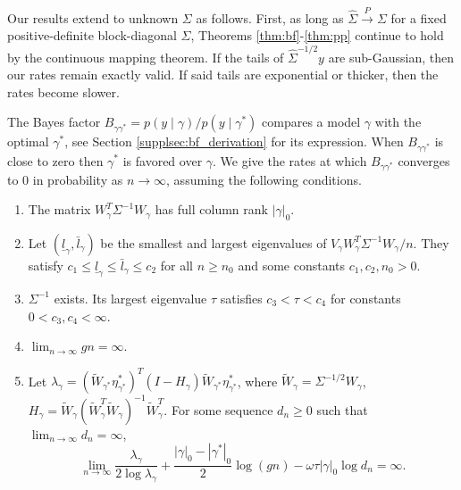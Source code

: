 Our results extend to unknown $\Sigma$ as follows. First, as long as $\hat{\Sigma} \stackrel{P}{\longrightarrow} \Sigma$ for a fixed positive-definite block-diagonal $\Sigma$, Theorems \ref{thm:bf}-\ref{thm:pp} continue to hold by the continuous mapping theorem.
If the tails of $\hat{\Sigma}^{-1/2} y$ are sub-Gaussian, then our rates remain exactly valid. If said tails are exponential or thicker, then the rates become slower. 


The Bayes factor $B_{\gamma \gamma^*}= p(y \mid \gamma) / p(y \mid \gamma^*)$ compares a model $\gamma$ with the optimal $\gamma^*$, see Section \ref{supplsec:bf_derivation} for its expression. When $B_{\gamma \gamma^*}$ is close to zero then $\gamma^*$ is favored over $\gamma$. We give the rates at which $B_{\gamma \gamma^*}$ converges to 0 in probability as $n \rightarrow \infty$, assuming the following conditions.

\begin{enumerate}[leftmargin=*,label=(A\arabic*)]
\item The matrix $W_\gamma^T \Sigma^{-1} W_\gamma$ has full column rank $|\gamma|_0$.

\item Let $(\underline{l}_\gamma,\bar{l}_\gamma)$ be the smallest and largest eigenvalues of $V_{\gamma} W_{\gamma}^T \Sigma^{-1} W_\gamma/n$.
They satisfy $c_1 \leq \underline{l}_\gamma \leq \bar{l}_\gamma \leq c_2$ for all $n \geq n_0$ and some constants $c_1,c_2,n_0>0$.

\item $\Sigma^{-1}$ exists. Its largest eigenvalue $\tau$ satisfies $c_3 < \tau < c_4$ for constants $0< c_3,c_4 < \infty$.

\item $\lim_{n \rightarrow \infty} g n= \infty$.

\item Let $\lambda_\gamma= (\widetilde{W}_{\gamma^*} \eta_{\gamma^*}^*)^T (I - H_\gamma) \widetilde{W}_{\gamma^*} \eta_{\gamma^*}^*$,
where $\widetilde{W}_\gamma= \Sigma^{-1/2} W_\gamma$, 
$H_\gamma= \widetilde{W}_\gamma (\widetilde{W}_\gamma^T \widetilde{W}_\gamma)^{-1} \widetilde{W}_\gamma^T$.
For some sequence $d_n \geq 0$ such that $\lim_{n \rightarrow \infty} d_n= \infty$,
$$
\lim_{n \rightarrow \infty} \frac{\lambda_\gamma}{2 \log \lambda_\gamma} + \frac{|\gamma|_0 - |\gamma^*|_0}{2} \log(gn) - \omega \tau |\gamma|_0 \log d_n= \infty.
$$

\end{enumerate}

